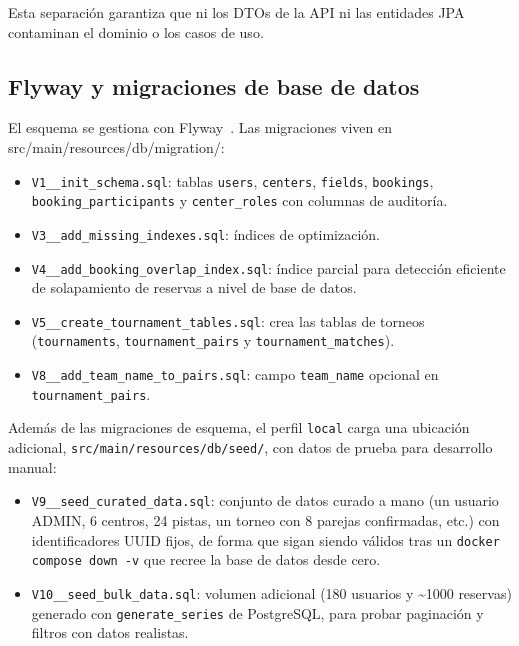 Esta separación garantiza que ni los DTOs de la API ni las entidades JPA
contaminan el dominio o los casos de uso.

\subsection{Flyway y migraciones de base de datos}

El esquema se gestiona con Flyway~\cite{flyway}. Las migraciones viven en
{\ttfamily src/\-main/\-resources/\-db/\-migration/}:

\begin{itemize}
  \item \texttt{V1\_\_init\_schema.sql}: tablas \texttt{users}, \texttt{centers},
    \texttt{fields}, \texttt{bookings}, \texttt{booking\_participants} y
    \texttt{center\_roles} con columnas de auditoría.
  \item \texttt{V3\_\_add\_missing\_indexes.sql}: índices de optimización.
  \item \texttt{V4\_\_add\_booking\_overlap\_index.sql}: índice parcial para
    detección eficiente de solapamiento de reservas a nivel de base de datos.
  \item \texttt{V5\_\_create\_tournament\_tables.sql}: crea las tablas de torneos
    (\texttt{tournaments}, \texttt{tournament\_pairs} y \texttt{tournament\_matches}).
  \item \texttt{V8\_\_add\_team\_name\_to\_pairs.sql}: campo
    \texttt{team\_name} opcional en \texttt{tournament\_pairs}.
\end{itemize}

Además de las migraciones de esquema, el perfil \texttt{local} carga una
ubicación adicional, \texttt{src/main/resources/db/seed/}, con datos de
prueba para desarrollo manual:

\begin{itemize}
  \item \texttt{V9\_\_seed\_curated\_data.sql}: conjunto de datos curado a
    mano (un usuario ADMIN, 6 centros, 24 pistas, un torneo con 8 parejas
    confirmadas, etc.) con identificadores UUID fijos, de forma que sigan
    siendo válidos tras un \texttt{docker compose down -v} que recree la
    base de datos desde cero.
  \item \texttt{V10\_\_seed\_bulk\_data.sql}: volumen adicional (180
    usuarios y \textasciitilde1000 reservas) generado con
    \texttt{generate\_series} de PostgreSQL, para probar paginación y
    filtros con datos realistas.
\end{itemize}

